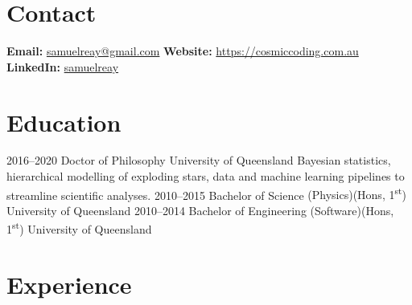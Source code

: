 \documentclass[11pt]{friggeri-cv}
\begin{document}
\pagestyle{plain}


\section{Contact}

\textbf{Email: } \href{samuelreay@gmail.com}{samuelreay@gmail.com}   \hspace{1mm}
\textbf{Website: } \href{https://cosmiccoding.com.au}{https://cosmiccoding.com.au}
\textbf{LinkedIn: } \href{https://www.linkedin.com/in/samuelreay/}{samuelreay}



\section{Education}

\begin{entrylist}
\entry
{2016--2020}
{Doctor of Philosophy}
{University of Queensland}
{Bayesian statistics, hierarchical modelling of exploding stars, data and machine learning pipelines to streamline scientific analyses.}
\entrysmall
{2010--2015}
{Bachelor of Science {\normalfont (Physics)(Hons, 1\textsuperscript{st})}}
{University of Queensland}
{}%
\entrysmall
{2010--2014}
{Bachelor of Engineering {\normalfont (Software)(Hons, 1\textsuperscript{st})}}
{University of Queensland}
{}%
\end{entrylist}



\section{Experience}
\end{document}
